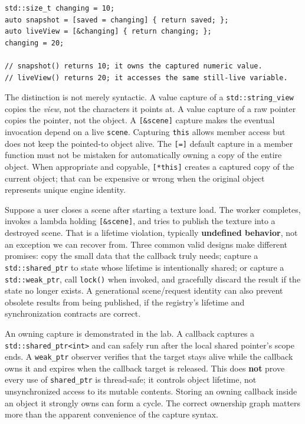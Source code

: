 \begin{verbatim}
std::size_t changing = 10;
auto snapshot = [saved = changing] { return saved; };
auto liveView = [&changing] { return changing; };
changing = 20;

// snapshot() returns 10; it owns the captured numeric value.
// liveView() returns 20; it accesses the same still-live variable.
\end{verbatim}

The distinction is not merely syntactic. A value capture of a \texttt{std::string\_view} copies the \emph{view}, not the characters it points at. A value capture of a raw pointer copies the pointer, not the object. A \texttt{{[}\&scene{]}} capture makes the eventual invocation depend on a live \texttt{scene}. Capturing \texttt{this} allows member access but does not keep the pointed-to object alive. The \texttt{{[}={]}} default capture in a member function must not be mistaken for automatically owning a copy of the entire object. When appropriate and copyable, \texttt{{[}*this{]}} creates a captured copy of the current object; that can be expensive or wrong when the original object represents unique engine identity.

Suppose a user closes a scene after starting a texture load. The worker completes, invokes a lambda holding \texttt{{[}\&scene{]}}, and tries to publish the texture into a destroyed scene. That is a lifetime violation, typically \textbf{undefined behavior}, not an exception we can recover from. Three common valid designs make different promises: copy the small data that the callback truly needs; capture a \texttt{std::shared\_ptr} to state whose lifetime is intentionally shared; or capture a \texttt{std::weak\_ptr}, call \texttt{lock()} when invoked, and gracefully discard the result if the state no longer exists. A generational scene/request identity can also prevent obsolete results from being published, if the registry's lifetime and synchronization contracts are correct.

An owning capture is demonstrated in the lab. A callback captures a \texttt{std::shared\_ptr\textless{}int\textgreater{}} and can safely run after the local shared pointer's scope ends. A \texttt{weak\_ptr} observer verifies that the target stays alive while the callback owns it and expires when the callback target is released. This does \textbf{not} prove every use of \texttt{shared\_ptr} is thread-safe; it controls object lifetime, not unsynchronized access to its mutable contents. Storing an owning callback inside an object it strongly owns can form a cycle. The correct ownership graph matters more than the apparent convenience of the capture syntax.

